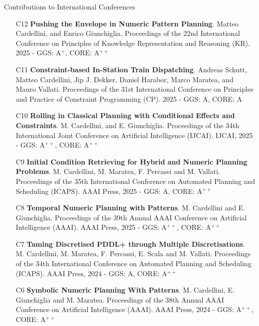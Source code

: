 \documentclass{resume} %
\begin{document}
\begin{rSection}{Contributions to International Conferences}
\begin{enumerate}[leftmargin=5mm]
	\item[C12] \textbf{Pushing the Envelope in Numeric Pattern Planning}. Matteo Cardellini, and Enrico Giunchiglia. Proceedings of the 22nd International Conference on Principles of Knowledge Representation and Reasoning (KR). 2025 - GGS: A$^{+}$, CORE: A$^{++}$
	
	
	\item[C11] \textbf{Constraint-based In-Station Train Dispatching}. Andreas Schutt, Matteo Cardellini, Jip J. Dekker, Daniel Harabor, Marco Maratea, and Mauro Vallati. Proceedings of the 31st International Conference on Principles and Practice of Constraint Programming (CP). 2025 - GGS: A, CORE: A
	
	
	\item[C10] \textbf{Rolling in Classical Planning with Conditional Effects and Constraints}. M. Cardellini, and E. Giunchiglia. Proceedings of the 34th International Joint Conference on Artificial Intelligence (IJCAI). IJCAI, 2025 - GGS: A$^{++}$, CORE: A$^{++}$
	
	\item[C9] \textbf{Initial Condition Retrieving for Hybrid and Numeric Planning Problems}. M. Cardellini, M. Maratea, F. Percassi and M. Vallati. Proceedings of the 35th International Conference on Automated Planning and Scheduling (ICAPS). AAAI Press, 2025 - GGS: A, CORE: A$^{++}$
	
	
	\item[C8] \textbf{Temporal Numeric Planning with Patterns}. M. Cardellini and E. Giunchiglia. Proceedings of the 39th Annual AAAI Conference on Artificial Intelligence (AAAI). AAAI Press, 2025 - GGS: A$^{++}$, CORE: A$^{++}$
	
	\item[C7] \textbf{Taming Discretised PDDL+ through Multiple Discretisations}. M. Cardellini, M. Maratea, F. Percassi, E. Scala and M. Vallati. Proceedings of the 34th International Conference on Automated Planning and Scheduling (ICAPS). AAAI Press, 2024 - GGS: A, CORE: A$^{++}$
	
	\item[C6] \textbf{Symbolic Numeric Planning With Patterns}. M. Cardellini, E. Giunchiglia and M. Maratea. Proceedings of the 38th Annual AAAI Conference on Artificial Intelligence (AAAI). AAAI Press, 2024 - GGS: A$^{++}$, CORE: A$^{++}$
	

\end{enumerate}
\end{rSection}
\end{document}
